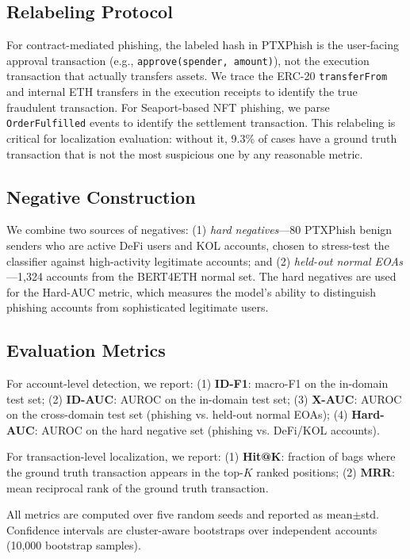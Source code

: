 \documentclass[conference]{IEEEtran}
\begin{document}


\subsection{Relabeling Protocol}
For contract-mediated phishing, the labeled hash in PTXPhish is the user-facing approval transaction (e.g., \texttt{approve(spender, amount)}), not the execution transaction that actually transfers assets. We trace the ERC-20 \texttt{transferFrom} and internal ETH transfers in the execution receipts to identify the true fraudulent transaction. For Seaport-based NFT phishing, we parse \texttt{OrderFulfilled} events to identify the settlement transaction. This relabeling is critical for localization evaluation: without it, 9.3\% of cases have a ground truth transaction that is not the most suspicious one by any reasonable metric.

\subsection{Negative Construction}
We combine two sources of negatives: (1) \emph{hard negatives}---80 PTXPhish benign senders who are active DeFi users and KOL accounts, chosen to stress-test the classifier against high-activity legitimate accounts; and (2) \emph{held-out normal EOAs}---1,324 accounts from the BERT4ETH normal set. The hard negatives are used for the Hard-AUC metric, which measures the model's ability to distinguish phishing accounts from sophisticated legitimate users.

\subsection{Evaluation Metrics}
For account-level detection, we report: (1) \textbf{ID-F1}: macro-F1 on the in-domain test set; (2) \textbf{ID-AUC}: AUROC on the in-domain test set; (3) \textbf{X-AUC}: AUROC on the cross-domain test set (phishing vs. held-out normal EOAs); (4) \textbf{Hard-AUC}: AUROC on the hard negative set (phishing vs. DeFi/KOL accounts).

For transaction-level localization, we report: (1) \textbf{Hit@K}: fraction of bags where the ground truth transaction appears in the top-$K$ ranked positions; (2) \textbf{MRR}: mean reciprocal rank of the ground truth transaction.

All metrics are computed over five random seeds and reported as mean$\pm$std. Confidence intervals are cluster-aware bootstraps over independent accounts (10,000 bootstrap samples).
\end{document}
